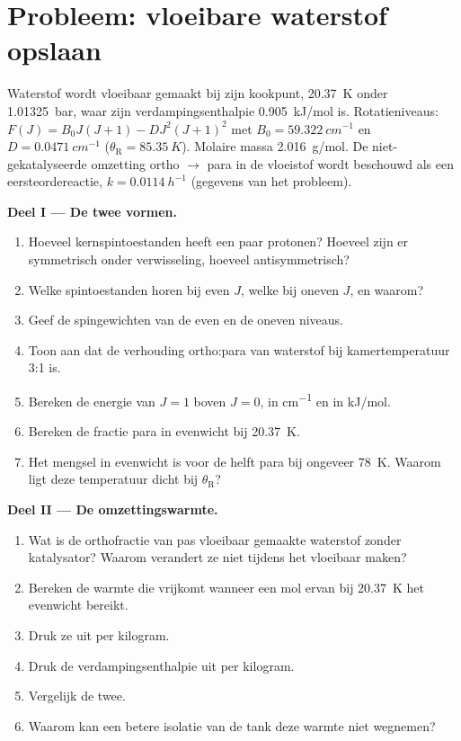 \section{Probleem: vloeibare waterstof opslaan}

\begin{problem}
\label{pb:b3:statistical-thermo-applied:1}
Waterstof wordt vloeibaar gemaakt bij zijn kookpunt, \qty{20.37}{K} onder
\qty{1.01325}{bar}, waar zijn verdampingsenthalpie \qty{0.905}{kJ/mol} is.
Rotatieniveaus: $F(J) = B_0J(J+1) -
D J^2(J+1)^2$ met $B_0 = \qty{59.322}{cm^{-1}}$ en $D = \qty{0.0471}{cm^{-1}}$ ($\theta_{\mathrm R} = \qty{85.35}{K}$).
Molaire massa \qty{2.016}{g/mol}. De niet-gekatalyseerde omzetting ortho
$\to$ para in de vloeistof wordt beschouwd als een eersteordereactie,
$k = \qty{0.0114}{h^{-1}}$ (gegevens van het probleem).

\medskip\noindent\textbf{Deel I --- De twee vormen.}
\begin{enumerate}
  \item Hoeveel kernspintoestanden heeft een paar protonen? Hoeveel zijn er
        symmetrisch onder verwisseling, hoeveel antisymmetrisch?
  \item Welke spintoestanden horen bij even $J$, welke bij oneven $J$, en waarom?
  \item Geef de spingewichten van de even en de oneven niveaus.
  \item Toon aan dat de verhouding ortho:para van waterstof bij
        kamertemperatuur 3:1 is.
  \item Bereken de energie van $J = 1$ boven $J = 0$, in \unit{cm^{-1}} en in
        \unit{kJ/mol}.
  \item Bereken de fractie para in evenwicht bij \qty{20.37}{K}.
  \item Het mengsel in evenwicht is voor de helft para bij ongeveer
        \qty{78}{K}. Waarom ligt deze temperatuur dicht bij $\theta_{\mathrm R}$?
\end{enumerate}

\medskip\noindent\textbf{Deel II --- De omzettingswarmte.}
\begin{enumerate}[resume]
  \item Wat is de orthofractie van pas vloeibaar gemaakte waterstof zonder
        katalysator? Waarom verandert ze niet tijdens het vloeibaar maken?
  \item Bereken de warmte die vrijkomt wanneer een mol ervan bij
        \qty{20.37}{K} het evenwicht bereikt.
  \item Druk ze uit per kilogram.
  \item Druk de verdampingsenthalpie uit per kilogram.
  \item Vergelijk de twee.
  \item Waarom kan een betere isolatie van de tank deze warmte niet
        wegnemen?
\end{enumerate}


\end{problem}
